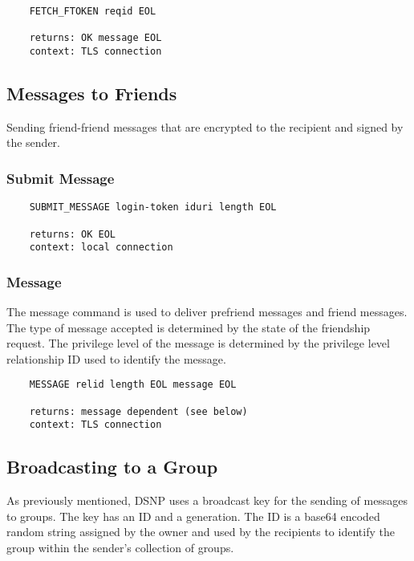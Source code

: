 \documentclass[letterpaper,11pt,oneside]{article}
\begin{document}
\vspace{10pt}
\begin{verbatim}
    FETCH_FTOKEN reqid EOL

    returns: OK message EOL
    context: TLS connection
\end{verbatim}

\subsection{Messages to Friends}

Sending friend-friend messages that are encrypted to the recipient and signed
by the sender. 

\subsubsection{Submit Message}

\vspace{10pt}
\begin{verbatim}
    SUBMIT_MESSAGE login-token iduri length EOL

    returns: OK EOL
    context: local connection
\end{verbatim}
\vspace{10pt}

\subsubsection{Message}

The message command is used to deliver prefriend messages and friend messages.
The type of message accepted is determined by the state of the friendship
request. The privilege level of the message is determined by the privilege
level relationship ID used to identify the message.

\vspace{10pt}
\begin{verbatim}
    MESSAGE relid length EOL message EOL

    returns: message dependent (see below)
    context: TLS connection
\end{verbatim}

\subsection{Broadcasting to a Group}

As previously mentioned, DSNP uses a broadcast key for the sending of messages
to groups. The key has an ID and a generation. The ID is a base64 encoded
random string assigned by the owner and used by the recipients to identify the
group within the sender's collection of groups.
\end{document}
